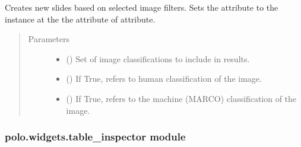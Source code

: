 \documentclass[letterpaper,10pt,english]{sphinxmanual}
\begin{document}
\begin{fulllineitems}
\begin{fulllineitems}
\label{\detokenize{polo.widgets:polo.widgets.slideshow_viewer.SlideshowViewer.update_slides_from_filters}}
Creates new  slides based on selected image filters.
Sets the  attribute to the {\hyperref[\detokenize{polo.crystallography:polo.crystallography.image.Image}]{}} instance at the 
the  attribute of  attribute.
\begin{quote}\begin{description}
\item[{Parameters}] \leavevmode\begin{itemize}
\item {} 
 () \textendash{} Set of image classifications to include in results.

\item {} 
 () \textendash{} If True,  refers to human classification 
of the image.

\item {} 
 () \textendash{} If True,  refers to the machine 
(MARCO) classification of the image.

\end{itemize}

\end{description}\end{quote}

\end{fulllineitems}


\end{fulllineitems}



\subsubsection{polo.widgets.table\_inspector module}
\label{\detokenize{polo.widgets:module-polo.widgets.table_inspector}}\label{\detokenize{polo.widgets:polo-widgets-table-inspector-module}}
\end{document}
